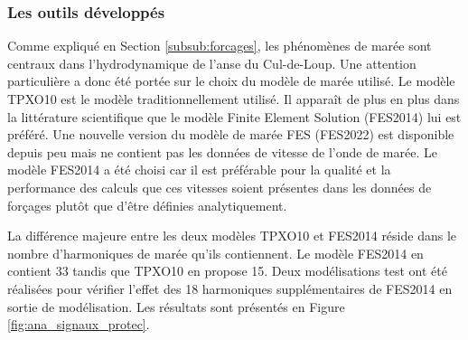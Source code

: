 \documentclass[10pt,a4paper,titlepage]{article}
\begin{document}




\subsubsection{Les outils développés }

Comme expliqué en Section \ref{subsub:forcages}, les phénomènes de marée sont centraux dans l'hydrodynamique de l'anse du Cul-de-Loup.
Une attention particulière a donc été portée sur le choix du modèle de marée utilisé.
Le modèle TPXO10 est le modèle traditionnellement utilisé.
Il apparaît de plus en plus dans la littérature scientifique que le modèle Finite Element Solution (FES2014) lui est préféré.
Une nouvelle version du modèle de marée FES (FES2022) est disponible depuis peu mais ne contient pas les données de vitesse de l'onde de marée.
Le modèle FES2014 a été choisi car il est préférable pour la qualité et la performance des calculs que ces vitesses soient présentes dans les données de forçages plutôt que d'être définies analytiquement.

La différence majeure entre les deux modèles TPXO10 et FES2014 réside dans le nombre d'harmoniques de marée qu'ils contiennent.
Le modèle FES2014 en contient 33 tandis que TPXO10 en propose 15.
Deux modélisations test ont été réalisées pour vérifier l'effet des 18 harmoniques supplémentaires de FES2014 en sortie de modélisation.
Les résultats sont présentés en Figure \ref{fig:ana_signaux_protec}.
\end{document}
